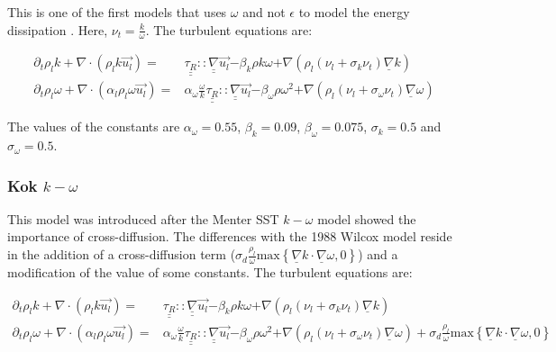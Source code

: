 This is one of the first models that uses $\omega$ and not $\epsilon$ to model the energy dissipation \cite{Wilcox1988}. Here, $\nu_t = \frac{k}{\omega}$. The turbulent equations are:

\begin{equation}
	\begin{split}
		\partial_t \rho_l k + \nabla \cdot ( \rho_l k \vec{u_l}) =  
		& { \underline{\underline{\tau_R}}::\underline{\underline{\nabla}}\vec{u_l} }
		{ - \beta_{k}\rho k \omega }
		{ + \nabla( \rho_l(\nu_l + \sigma_k \nu_t) \underline{\nabla} k) } 
		\\
		\partial_t  \rho_l \omega + \nabla \cdot (\alpha_l \rho_l \omega \vec{u_l}) =
		& { \alpha_{\omega}  \frac{\omega}{k}\underline{\underline{\tau_R}}::\underline{\underline{\nabla}}\vec{u_l} }
		{ - \beta_{\omega}\rho \omega^2 }
		{ +\nabla(  \rho_l(\nu_l + \sigma_{\omega} \nu_t) \underline{\nabla} \omega) }
	\end{split}
\end{equation}

The values of the constants are $\alpha_{\omega} = 0.55$, $\beta_{k} = 0.09$, $\beta_{\omega} = 0.075$, $\sigma_k = 0.5$ and $\sigma_{\omega} = 0.5$.

\subsubsection{Kok $k-\omega$}

This model \cite{Kok1999} was introduced after the Menter SST $k-\omega$ model \cite{Menter1993, Menter2003} showed the importance of cross-diffusion. The differences with the 1988 Wilcox model reside in the addition of a cross-diffusion term (${ \sigma_d\frac{  \rho_l}{\omega} } \text{max}\left\{{\underline{\nabla}k \cdot \underline{\nabla} \omega}, 0\right\}  $) and a modification of the value of some constants. The turbulent equations are:

\begin{equation}
	\begin{split} \label{eq_omega_Kok}
		\partial_t \rho_l k + \nabla \cdot ( \rho_l k \vec{u_l}) =  
		& { \underline{\underline{\tau_R}}::\underline{\underline{\nabla}}\vec{u_l} }
		{ - \beta_{k}\rho k \omega }
		{ + \nabla( \rho_l(\nu_l + \sigma_k \nu_t) \underline{\nabla} k) } 
		\\
		\partial_t  \rho_l \omega + \nabla \cdot (\alpha_l \rho_l \omega \vec{u_l}) =
		& { \alpha_{\omega}  \frac{\omega}{k}\underline{\underline{\tau_R}}::\underline{\underline{\nabla}}\vec{u_l} }
		{ - \beta_{\omega}\rho \omega^2 }
		{ +\nabla(  \rho_l(\nu_l + \sigma_{\omega} \nu_t) \underline{\nabla} \omega) }
		+ { \sigma_d\frac{  \rho_l}{\omega} } \text{max}\left\{{\underline{\nabla}k \cdot \underline{\nabla} \omega}, 0\right\}  
	\end{split}
\end{equation}

